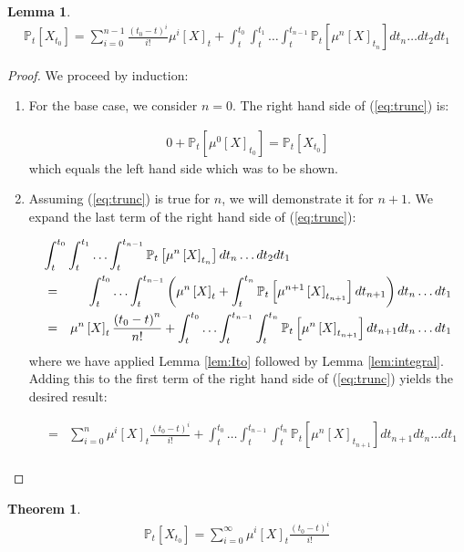 \documentclass{article}
\newtheorem{thm}{Theorem}
\newtheorem{lem}{Lemma}
\newcommand{\bra}[1]{\left[#1\right]}
\renewcommand{\P}[1]{\mathbb{P}_t\bra{#1}}
\newcommand{\mun}[2]{\mu^{#1}\bra{#2}}
\begin{document}
\begin{lem}
  \begin{eqnarray}
    \P{X_{t_0}} = \sum_{i=0}^{n-1} \frac{\left(t_0 - t\right)^i}{i!} \mun{i}{X}_t + \int_t^{t_0} \int_t^{t_1} \ldots \int_t^{t_{n-1}} \P{\mun{n}{X}_{t_n}} dt_n \ldots dt_2 dt_1\label{eq:trunc}
  \end{eqnarray}
\end{lem}
\begin{proof}
  We proceed by induction:

  \begin{enumerate}
  \item
    For the base case, we consider $n=0$.
    The right hand side of (\ref{eq:trunc}) is:

    \begin{eqnarray*}
      0 + \P{\mun{0}{X}_{t_0}} = \P{X_{t_0}}
    \end{eqnarray*}
    which equals the left hand side which was to be shown.

  \item
    Assuming (\ref{eq:trunc}) is true for $n$, we will demonstrate it for $n+1$.
    We expand the last term of the right hand side of (\ref{eq:trunc}):

    \begin{eqnarray*}
      \lefteqn{\int_t^{t_0} \int_t^{t_1} \ldots \int_t^{t_{n-1}} \P{\mun{n}{X}_{t_n}} dt_n \ldots dt_2 dt_1}\\
      & = & \int_t^{t_0} \ldots \int_t^{t_{n-1}} \left(\mun{n}{X}_t + \int_t^{t_n}\P{\mun{n+1}{X}_{t_{n+1}}}dt_{n+1}\right)dt_n \ldots dt_1\\
      & = & \mun{n}{X}_t \frac{\left(t_0 - t\right)^n}{n!} + \int_t^{t_0} \ldots \int_t^{t_{n-1}} \int_t^{t_n}\P{\mun{n}{X}_{t_{n+1}}}dt_{n+1}dt_n \ldots dt_1\\
    \end{eqnarray*}
    where we have applied Lemma \ref{lem:Ito} followed by Lemma \ref{lem:integral}.
    Adding this to the first term of the right hand side of (\ref{eq:trunc}) yields the desired result:

    \begin{eqnarray*}
      & = & \sum_{i=0}^n \mun{i}{X}_t \frac{\left(t_0 - t\right)^i}{i!} + \int_t^{t_0} \ldots \int_t^{t_{n-1}} \int_t^{t_n}\P{\mun{n}{X}_{t_{n+1}}}dt_{n+1}dt_n \ldots dt_1\\
    \end{eqnarray*}
    
  \end{enumerate}
\end{proof}

\begin{thm}
  \begin{eqnarray*}
    \P{X_{t_0}} = \sum_{i=0}^\infty \mun{i}{X}_t \frac{\left(t_0 - t\right)^i}{i!}
  \end{eqnarray*}
\end{thm}
\end{document}

